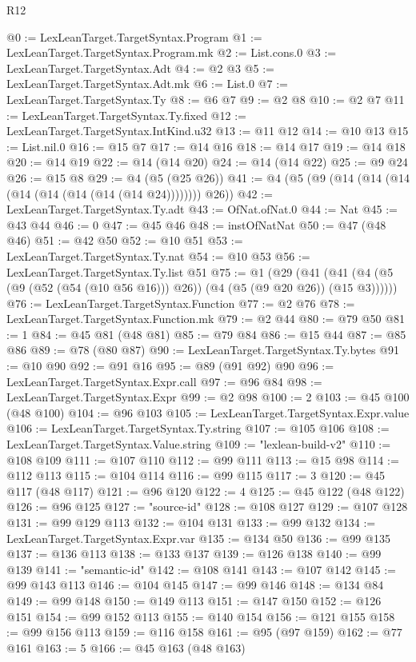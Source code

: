 \begin{lexlean}{R12}
\begin{coremodule}
{{{{{{{{{{{{{{{{{{{{{{{{{{{{{{{{{{{{{{{{{{{{{{{{{{{{{{{{{{{{{{{{{{{{{{{{{{{{{{{{{{{{{{{{{{{{{{{{{{{{{{{{{{@0 := LexLeanTarget.TargetSyntax.Program
@1 := LexLeanTarget.TargetSyntax.Program.mk
@2 := List.cons.{0}
@3 := LexLeanTarget.TargetSyntax.Adt
@4 := @2 @3
@5 := LexLeanTarget.TargetSyntax.Adt.mk
@6 := List.{0}
@7 := LexLeanTarget.TargetSyntax.Ty
@8 := @6 @7
@9 := @2 @8
@10 := @2 @7
@11 := LexLeanTarget.TargetSyntax.Ty.fixed
@12 := LexLeanTarget.TargetSyntax.IntKind.u32
@13 := @11 @12
@14 := @10 @13
@15 := List.nil.{0}
@16 := @15 @7
@17 := @14 @16
@18 := @14 @17
@19 := @14 @18
@20 := @14 @19
@22 := @14 (@14 @20)
@24 := @14 (@14 @22)
@25 := @9 @24
@26 := @15 @8
@29 := @4 (@5 (@25 @26))
@41 := @4 (@5 (@9 (@14 (@14 (@14 (@14 (@14 (@14 (@14 (@14 @24)))))))) @26))
@42 := LexLeanTarget.TargetSyntax.Ty.adt
@43 := OfNat.ofNat.{0}
@44 := Nat
@45 := @43 @44
@46 := 0
@47 := @45 @46
@48 := instOfNatNat
@50 := @47 (@48 @46)
@51 := @42 @50
@52 := @10 @51
@53 := LexLeanTarget.TargetSyntax.Ty.nat
@54 := @10 @53
@56 := LexLeanTarget.TargetSyntax.Ty.list @51
@75 := @1
    (@29 (@41 (@41 (@4 (@5 (@9 (@52 (@54 (@10 @56 @16))) @26)) (@4 (@5 (@9 @20 @26)) (@15 @3))))))
@76 := LexLeanTarget.TargetSyntax.Function
@77 := @2 @76
@78 := LexLeanTarget.TargetSyntax.Function.mk
@79 := @2 @44
@80 := @79 @50
@81 := 1
@84 := @45 @81 (@48 @81)
@85 := @79 @84
@86 := @15 @44
@87 := @85 @86
@89 := @78 (@80 @87)
@90 := LexLeanTarget.TargetSyntax.Ty.bytes
@91 := @10 @90
@92 := @91 @16
@95 := @89 (@91 @92) @90
@96 := LexLeanTarget.TargetSyntax.Expr.call
@97 := @96 @84
@98 := LexLeanTarget.TargetSyntax.Expr
@99 := @2 @98
@100 := 2
@103 := @45 @100 (@48 @100)
@104 := @96 @103
@105 := LexLeanTarget.TargetSyntax.Expr.value
@106 := LexLeanTarget.TargetSyntax.Ty.string
@107 := @105 @106
@108 := LexLeanTarget.TargetSyntax.Value.string
@109 := "lexlean-build-v2"
@110 := @108 @109
@111 := @107 @110
@112 := @99 @111
@113 := @15 @98
@114 := @112 @113
@115 := @104 @114
@116 := @99 @115
@117 := 3
@120 := @45 @117 (@48 @117)
@121 := @96 @120
@122 := 4
@125 := @45 @122 (@48 @122)
@126 := @96 @125
@127 := "source-id"
@128 := @108 @127
@129 := @107 @128
@131 := @99 @129 @113
@132 := @104 @131
@133 := @99 @132
@134 := LexLeanTarget.TargetSyntax.Expr.var
@135 := @134 @50
@136 := @99 @135
@137 := @136 @113
@138 := @133 @137
@139 := @126 @138
@140 := @99 @139
@141 := "semantic-id"
@142 := @108 @141
@143 := @107 @142
@145 := @99 @143 @113
@146 := @104 @145
@147 := @99 @146
@148 := @134 @84
@149 := @99 @148
@150 := @149 @113
@151 := @147 @150
@152 := @126 @151
@154 := @99 @152 @113
@155 := @140 @154
@156 := @121 @155
@158 := @99 @156 @113
@159 := @116 @158
@161 := @95 (@97 @159)
@162 := @77 @161
@163 := 5
@166 := @45 @163 (@48 @163)
}}}}}}}}}}}}}}}}}}}}}}}}}}}}}}}}}}}}}}}}}}}}}}}}}}}}}}}}}}}}}}}}}}}}}}}}}}}}}}}}}}}}}}}}}}}}}}}}}}}}}}}}}}
\end{coremodule}
\end{lexlean}
